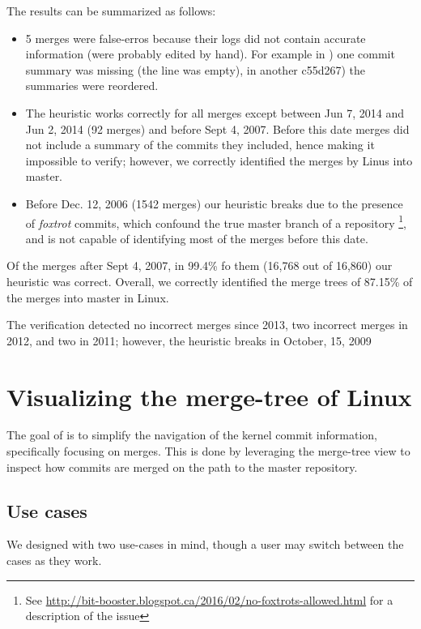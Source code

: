 \documentclass[conference, draftclsnofoot, draft]{IEEEtran}
\begin{document}
The results can be summarized as follows:

\begin{itemize}
\item 5 merges were false-erros because their logs did not contain accurate information (were probably edited by
  hand). For example in ) one commit summary was missing (the line was empty), in another  \mycode
  {c55d267}) the summaries were reordered.
\item The heuristic works correctly for all merges except between Jun 7, 2014 and Jun 2, 2014 (92 merges) and before
  Sept 4, 2007. Before this date merges did not include a summary of the commits they included, hence making it
  impossible to verify; however, we correctly identified the merges by Linus into master. 
\item Before Dec. 12, 2006 (1542 merges) our heuristic breaks due to the
presence of \textit{foxtrot} commits, which confound the true master branch of a
repository
\footnote{See \url{http://bit-booster.blogspot.ca/2016/02/no-foxtrots-allowed.html} for a description of the issue}, and
is not capable of identifying most of the merges before this date.
\end{itemize}

Of the merges after Sept 4, 2007, in 99.4\% fo them (16,768 out of 16,860)  our heuristic was correct. Overall, we
correctly identified the merge trees of 87.15\% of the merges into master in Linux.
 
The verification detected no incorrect merges since 2013, two incorrect merges in
2012, and two in 2011; however, the heuristic breaks in October, 15, 2009 

\section{Visualizing the merge-tree of Linux}

The goal of \tool is to simplify the navigation of the kernel commit information,
specifically focusing on merges. This is done by leveraging the merge-tree view to
inspect how commits are merged on the path to the master repository.

\subsection{Use cases}

We designed \tool with two use-cases in mind, though a user may switch between the
cases as they work.
\end{document}

